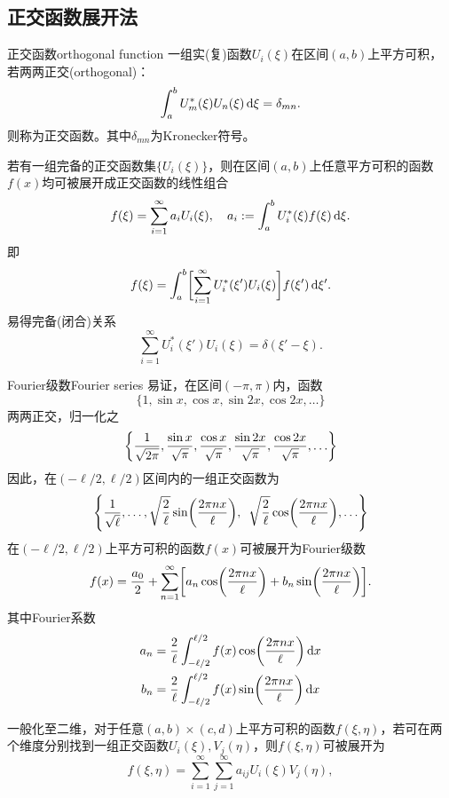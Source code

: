 \subsection{正交函数展开法}
\begin{definition}{正交函数}{orthogonal function}
    一组实(复)函数$U_i(\xi)$在区间$(a,b)$上平方可积，若两两正交(orthogonal)：
    \begin{equation}
        \int_a^bU_m^\ast(\xi)U_n(\xi)\mathop{}\!\mathrm{d}\xi=\delta_{mn}.
    \end{equation}
    则称为正交函数。其中$\delta_{mn}$为Kronecker符号。
\end{definition}
若有一组完备的正交函数集$\{U_i(\xi)\}$，则在区间$(a,b)$上任意平方可积的函数$f(x)$均可被展开成正交函数的线性组合
\[
    f(\xi)=\sum_{i=1}^\infty a_iU_i(\xi),\quad a_i:=\int_a^bU_i^\ast(\xi)f(\xi)\mathop{}\!\mathrm{d}\xi.
\]
即
\[
    f(\xi)=\int_a^b\biggl[\sum_{i=1}^\infty U_i^\ast(\xi')U_i(\xi)\biggr]f(\xi')\mathop{}\!\mathrm{d}\xi'.
\]
易得完备(闭合)关系
\begin{equation}
    \sum_{i=1}^\infty U_i^\ast(\xi')U_i(\xi)=\delta(\xi'-\xi).
\end{equation}
\begin{example}{Fourier级数}{Fourier series}
    易证，在区间$(-\pi,\pi)$内，函数
    \[
        \{1,\sin x,\cos x,\sin 2x,\cos 2x,\ldots\}
    \]
    两两正交，归一化之
    \[
        \left\{\frac1{\sqrt{2\pi}},\frac{\sin x}{\sqrt\pi},\frac{\cos x}{\sqrt\pi},\frac{\sin 2x}{\sqrt\pi},\frac{\cos 2x}{\sqrt\pi},\ldots\right\}
    \]
    因此，在$(-\ell/2,\ell/2)$区间内的一组正交函数为
    \[
        \left\{\frac1{\sqrt\ell},\ldots,\sqrt{\frac2\ell}\sin\biggl(\frac{2\pi nx}\ell\biggr),\enspace\sqrt{\frac2\ell}\cos\biggl(\frac{2\pi nx}\ell\biggr),\ldots\right\}
    \]
    在$(-\ell/2,\ell/2)$上平方可积的函数$f(x)$可被展开为Fourier级数
    \begin{equation}
        f(x)=\frac{a_0}2+\sum_{n=1}^\infty\biggl[a_n\cos\biggl(\frac{2\pi nx}{\ell}\biggr)+b_n\sin\biggl(\frac{2\pi nx}{\ell}\biggr)\biggr].
    \end{equation}
    其中Fourier系数
    \begin{align*}
        a_n&=\frac2\ell\int_{-\ell/2}^{\ell/2}f(x)\cos\biggl(\frac{2\pi nx}{\ell}\biggr)\mathop{}\!\mathrm{d} x\\
        b_n&=\frac2\ell\int_{-\ell/2}^{\ell/2}f(x)\sin\biggl(\frac{2\pi nx}{\ell}\biggr)\mathop{}\!\mathrm{d} x
    \end{align*}
\end{example}
一般化至二维，对于任意$(a,b)\times(c,d)$上平方可积的函数$f(\xi,\eta)$，若可在两个维度分别找到一组正交函数$U_i(\xi),V_j(\eta)$，则$f(\xi,\eta)$可被展开为
\[
    f(\xi,\eta)=\sum_{i=1}^\infty\sum_{j=1}^\infty a_{ij}U_i(\xi)V_j(\eta),
\]
